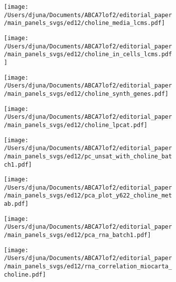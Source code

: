 \documentclass[12pt]{article}
\begin{document}
\begin{figure}[H]
    \begin{subfigure}[t]{.7\textwidth}
        \caption{}
        \texttt{[image: /Users/djuna/Documents/ABCA7lof2/editorial\_paper/main\_panels\_svgs/ed12/choline\_media\_lcms.pdf]}        
    \end{subfigure}
    \begin{subfigure}[t]{.3\textwidth}
        \caption{}
        \texttt{[image: /Users/djuna/Documents/ABCA7lof2/editorial\_paper/main\_panels\_svgs/ed12/choline\_in\_cells\_lcms.pdf]}        
    \end{subfigure}
    \begin{subfigure}[t]{0.25\textwidth}
        \caption{}
        \texttt{[image: /Users/djuna/Documents/ABCA7lof2/editorial\_paper/main\_panels\_svgs/ed12/choline\_synth\_genes.pdf]}        
    \end{subfigure}
    \begin{subfigure}[t]{0.25\textwidth}
        \caption{}
        \texttt{[image: /Users/djuna/Documents/ABCA7lof2/editorial\_paper/main\_panels\_svgs/ed12/choline\_lpcat.pdf]}        
    \end{subfigure}
    \begin{subfigure}[t]{.35\textwidth}
        \caption{}
        \texttt{[image: /Users/djuna/Documents/ABCA7lof2/editorial\_paper/main\_panels\_svgs/ed12/pc\_unsat\_with\_choline\_batch1.pdf]}        
    \end{subfigure} 
    \begin{subfigure}[t]{.25\textwidth}
        \caption{}
        \vspace{.3cm}
        \texttt{[image: /Users/djuna/Documents/ABCA7lof2/editorial\_paper/main\_panels\_svgs/ed12/pca\_plot\_y622\_choline\_metab.pdf]}        
    \end{subfigure} 
    \begin{subfigure}[t]{0.2\textwidth}
        \caption{}
        \texttt{[image: /Users/djuna/Documents/ABCA7lof2/editorial\_paper/main\_panels\_svgs/ed12/pca\_rna\_batch1.pdf]}        
    \end{subfigure}  
    \hspace{.25cm}
    \begin{subfigure}[t]{0.2\textwidth}
        \caption{}
        \texttt{[image: /Users/djuna/Documents/ABCA7lof2/editorial\_paper/main\_panels\_svgs/ed12/rna\_correlation\_miocarta\_choline.pdf]}        

\end{subfigure}
\end{figure}
\end{document}
